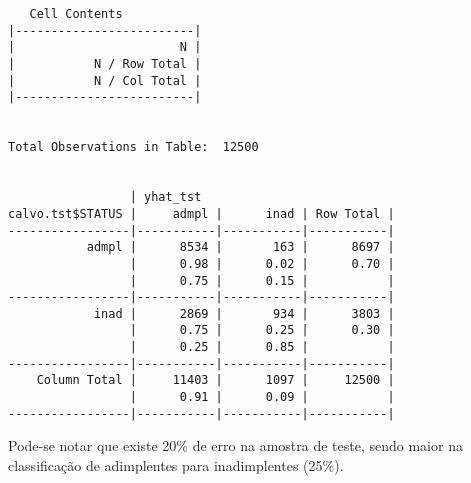 \begin{lstlisting}
   Cell Contents
|-------------------------|
|                       N |
|           N / Row Total |
|           N / Col Total |
|-------------------------|
 
 
Total Observations in Table:  12500 
 
 
                 | yhat_tst 
calvo.tst$STATUS |     admpl |      inad | Row Total | 
-----------------|-----------|-----------|-----------|
           admpl |      8534 |       163 |      8697 | 
                 |      0.98 |      0.02 |      0.70 | 
                 |      0.75 |      0.15 |           | 
-----------------|-----------|-----------|-----------|
            inad |      2869 |       934 |      3803 | 
                 |      0.75 |      0.25 |      0.30 | 
                 |      0.25 |      0.85 |           | 
-----------------|-----------|-----------|-----------|
    Column Total |     11403 |      1097 |     12500 | 
                 |      0.91 |      0.09 |           | 
-----------------|-----------|-----------|-----------|
\end{lstlisting}


Pode-se notar que existe 20\% de erro na amostra de teste, sendo maior
na classificação de adimplentes para inadimplentes (25\%). 
